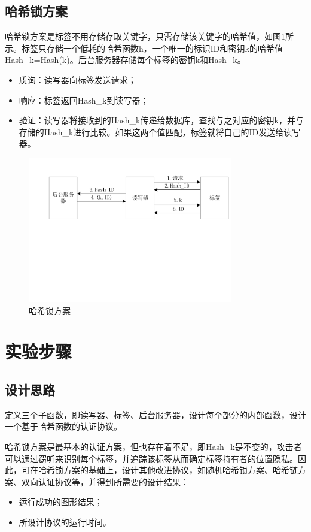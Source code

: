 \documentclass[a4paper]{ctexart}
\begin{document}
\subsection{哈希锁方案}
哈希锁方案是标签不用存储存取关键字，只需存储该关键字的哈希值，如图1所示。标签只存储一个低耗的哈希函数h，一个唯一的标识ID和密钥k的哈希值Hash\_k=Hash(k)。后台服务器存储每个标签的密钥k和Hash\_k。
\begin{itemize}
	\item 质询：读写器向标签发送请求；
	\item 响应：标签返回Hash\_k到读写器；
	\item 验证：读写器将接收到的Hash\_k传递给数据库，查找与之对应的密钥k，并与存储的Hash\_k进行比较。如果这两个值匹配，标签就将自己的ID发送给读写器。
\end{itemize}
\begin{figure}[htbp]
	\centering
	\includegraphics[width=0.8\textwidth]{figure/1.pdf}
	\caption{哈希锁方案}
\end{figure}

\section{实验步骤}
\subsection{设计思路}
定义三个子函数，即读写器、标签、后台服务器，设计每个部分的内部函数，设计一个基于哈希函数的认证协议。

哈希锁方案是最基本的认证方案，但也存在着不足，即Hash\_k是不变的，攻击者可以通过窃听来识别每个标签，并追踪该标签从而确定标签持有者的位置隐私。因此，可在哈希锁方案的基础上，设计其他改进协议，如随机哈希锁方案、哈希链方案、双向认证协议等，并得到所需要的设计结果：
\begin{itemize}
	\item 运行成功的图形结果；
	\item 所设计协议的运行时间。
\end{itemize}
\end{document}
